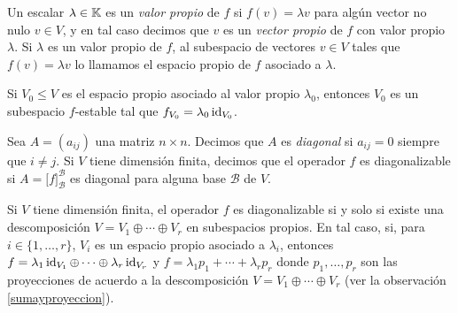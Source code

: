\begin{defn}
  Un escalar $\lambda\in\mathbb{K}$ es un \emph{valor propio} de $f$ si $f(v)=\lambda v$ para algún vector no nulo $v\in V$, y en tal caso decimos que $v$ es un \emph{vector propio} de $f$ con valor propio $\lambda$. Si $\lambda$ es un valor propio de $f$, al subespacio de vectores $v\in V$ tales que $f(v)=\lambda v$ lo llamamos el espacio propio de $f$ asociado a $\lambda$.
\end{defn}

\begin{obs}
  Si $V_0\le V$ es el espacio propio asociado al valor propio $\lambda_0$, entonces $V_0$ es un subespacio $f$-estable tal que $f_{V_0}=\lambda_0\operatorname{id}_{V_0}$.
\end{obs}

\begin{defn}
Sea $A=(a_{ij})$ una matriz $n\times n$. Decimos que $A$ es \emph{diagonal} si $a_{ij}=0$ siempre que $i\ne j$. Si $V$ tiene dimensión finita, decimos que el operador $f$ es diagonalizable si $A=\Big[f\Big]^{\mathcal{B}}_{\mathcal{B}}$ es diagonal para alguna base $\mathcal{B}$ de $V$.
\end{defn}

\begin{teo}\label{diagosiysolosi}
Si $V$ tiene dimensión finita, el operador $f$ es diagonalizable si y solo si existe una descomposición $V=V_1\oplus\cdots\oplus V_r$ en subespacios propios. En tal caso, si, para $i\in\{1,\ldots,r\}$, $V_i$ es un espacio propio asociado a $\lambda_i$, entonces $f=\lambda_1\operatorname{id}_{V_1}\oplus\cdots\oplus\lambda_r\operatorname{id}_{V_r}$ y $f=\lambda_1p_1+\cdots+\lambda_rp_r$ donde $p_1,\ldots,p_r$ son las proyecciones de acuerdo a la descomposición $V=V_1\oplus\cdots\oplus V_r$ (ver la observación \ref{sumayproyeccion}).
\end{teo}

